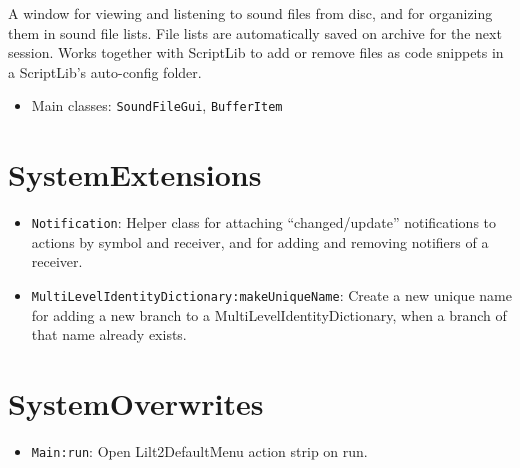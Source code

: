 \documentclass[11pt, a4paper]{scrartcl}
\begin{document}
A window for viewing and listening to sound files from disc, and for organizing them in sound file lists. File lists are automatically saved on archive for the next session. Works together with ScriptLib to add or remove files as code snippets in a ScriptLib's auto-config folder. 

\begin{itemize}
\item Main classes: \texttt{SoundFileGui}, \texttt{BufferItem}
\end{itemize}
\section{SystemExtensions}
\label{sec-9}


\begin{itemize}
\item \texttt{Notification}: Helper class for attaching ``changed/update'' notifications to actions by symbol and receiver, and for adding and removing notifiers of a receiver.
\item \texttt{MultiLevelIdentityDictionary:makeUniqueName}: Create a new unique name for adding a new branch to a MultiLevelIdentityDictionary, when a branch of that name already exists.
\end{itemize}
\section{SystemOverwrites}
\label{sec-10}


\begin{itemize}
\item \texttt{Main:run}: Open Lilt2DefaultMenu action strip on run.
\end{itemize}
\end{document}
